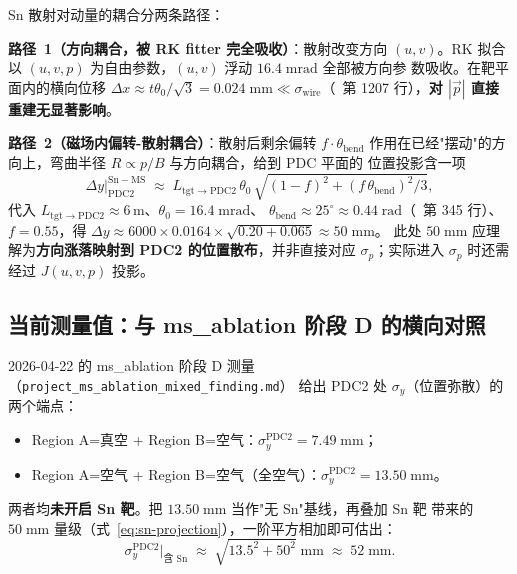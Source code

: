 Sn 散射对动量的耦合分两条路径：

\textbf{路径~1（方向耦合，被 RK fitter 完全吸收）}：散射改变方向 $(u, v)$。RK
拟合以 $(u, v, p)$ 为自由参数，$(u, v)$ 浮动 $16.4\;\mathrm{mrad}$ 全部被方向参
数吸收。在靶平面内的横向位移 $\Delta x \approx t\theta_0/\sqrt{3} = 0.024\;\mathrm{mm}
\ll \sigma_\mathrm{wire}$（\StatusReport{}~第 1207 行），\textbf{对 $|\vec p|$ 直接重建无显著影响}。

\textbf{路径~2（磁场内偏转-散射耦合）}：散射后剩余偏转 $f \cdot \theta_\mathrm{bend}$
作用在已经"摆动"的方向上，弯曲半径 $R \propto p/B$ 与方向耦合，给到 PDC 平面的
位置投影含一项
\begin{equation}
  \Delta y \big|_\mathrm{PDC2}^\mathrm{Sn-MS}
  \;\approx\; L_\mathrm{tgt\to PDC2}\,\theta_0\,\sqrt{(1-f)^2 + (f\,\theta_\mathrm{bend})^2/3},
\label{eq:sn-projection}
\end{equation}
代入 $L_\mathrm{tgt\to PDC2} \approx 6\,\mathrm{m}$、$\theta_0 = 16.4\;\mathrm{mrad}$、
$\theta_\mathrm{bend} \approx 25^\circ \approx 0.44\;\mathrm{rad}$（\StatusReport{}~第
345 行）、$f = 0.55$，得
\(\Delta y \approx 6000 \times 0.0164 \times \sqrt{0.20 + 0.065} \approx 50\;\mathrm{mm}\)。
此处 $50\;\mathrm{mm}$ 应理解为\textbf{方向涨落映射到 PDC2 的位置散布}，并非直接对应
$\sigma_p$；实际进入 $\sigma_p$ 时还需经过 $J(u,v,p)$ 投影。

\subsection{当前测量值：与 ms\_ablation 阶段 D 的横向对照}
\label{sec:budget-sn-ms-current}

2026-04-22 的 ms\_ablation 阶段 D 测量（\texttt{project\_ms\_ablation\_mixed\_finding.md}）
给出 PDC2 处 $\sigma_y$（位置弥散）的两个端点：
\begin{itemize}
  \item Region A=真空 + Region B=空气：$\sigma_y^\mathrm{PDC2} = 7.49\;\mathrm{mm}$；
  \item Region A=空气 + Region B=空气（全空气）：$\sigma_y^\mathrm{PDC2} = 13.50\;\mathrm{mm}$。
\end{itemize}
两者均\textbf{未开启 Sn 靶}。把 $13.50\;\mathrm{mm}$ 当作"无 Sn"基线，再叠加 Sn 靶
带来的 $50\;\mathrm{mm}$ 量级（式~\ref{eq:sn-projection}），一阶平方相加即可估出：
\begin{equation}
  \sigma_y^\mathrm{PDC2}\bigl|_{\text{含 Sn}}
   \;\approx\;\sqrt{13.5^2 + 50^2}\;\mathrm{mm}
   \;\approx\;52\;\mathrm{mm}.
\end{equation}

